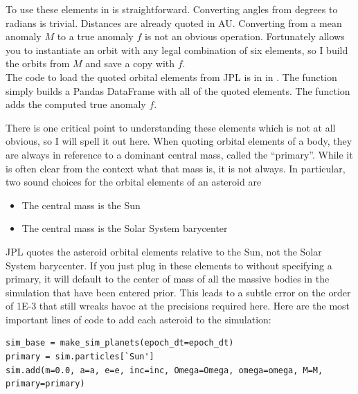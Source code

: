 To use these elements in  is straightforward.
Converting angles from degrees to radians is trivial.
Distances are already quoted in AU.
Converting from a mean anomaly $M$ to a true anomaly $f$ is not an obvious operation.
Fortunately  allows you to instantiate an orbit with any legal combination of six elements,
so I build the orbits from $M$ and save a copy with $f$. \\
The code to load the quoted orbital elements from JPL is in  in .
The function  simply builds a Pandas DataFrame with all of the quoted elements.
The function  adds the computed true anomaly $f$.

There is one critical point to understanding these elements which is not at all obvious, so I will spell it out here.
When quoting orbital elements of a body, they are always in reference to a dominant central mass, called the ``primary''.
While it is often clear from the context what that mass is, it is not always.
In particular, two sound choices for the orbital elements of an asteroid are
\begin{samepage}
\begin{itemize}
\item The central mass is the Sun
\item The central mass is the Solar System barycenter
\end{itemize}
\end{samepage}
JPL quotes the asteroid orbital elements relative to the Sun, not the Solar System barycenter.
If you just plug in these elements to  without specifying a primary, 
it will default to the center of mass of all the massive bodies in the simulation that have been entered prior.
This leads to a subtle error on the order of 1E-3 that still wreaks havoc at the precisions required here.
Here are the most important lines of code to add each asteroid to the simulation:
\begin{lstlisting}[style=CodeSnippet]
sim_base = make_sim_planets(epoch_dt=epoch_dt)
primary = sim.particles[`Sun']
sim.add(m=0.0, a=a, e=e, inc=inc, Omega=Omega, omega=omega, M=M, primary=primary)
\end{lstlisting}

